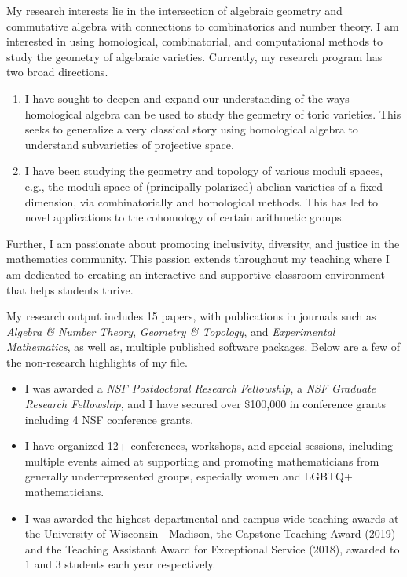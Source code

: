 \documentclass[11pt]{article}
\begin{document}
My research interests lie in the intersection of algebraic geometry and commutative algebra with connections to combinatorics and number theory. I am interested in using homological, combinatorial, and computational methods to study the geometry of algebraic varieties. Currently, my research program has two broad directions.
\begin{enumerate}[leftmargin=*,label=(\roman*)]
\item I have sought to deepen and expand our understanding of the ways homological algebra can be used to study the geometry of toric varieties. This seeks to generalize a very classical story using homological algebra to understand subvarieties of projective space.
\item I have been studying the geometry and topology of various moduli spaces, e.g., the moduli space of (principally polarized) abelian varieties of a fixed dimension, via combinatorially and homological methods. This has led to novel applications to the cohomology of certain arithmetic groups. 
\end{enumerate}
Further, I am passionate about promoting inclusivity, diversity, and justice in the mathematics community. This passion extends throughout my teaching where I am dedicated to creating an interactive and supportive classroom environment that helps students thrive.


My research output includes 15 papers, with publications in journals such as \textit{Algebra \& Number Theory}, \textit{Geometry \& Topology}, and \textit{Experimental Mathematics}, as well as, multiple published software packages. Below are a few of the non-research highlights of my file.

\begin{itemize}[leftmargin=*]
\item I was awarded a \textit{NSF Postdoctoral Research Fellowship}, a \textit{NSF Graduate Research Fellowship}, and I have secured over \$100,000 in conference grants including 4 NSF conference grants. 
\item I have organized 12+ conferences, workshops, and special sessions, including multiple events aimed at supporting and promoting mathematicians from generally underrepresented groups, especially women and LGBTQ+ mathematicians. 
\item I was awarded the highest departmental and campus-wide teaching awards at the University of Wisconsin - Madison, the Capstone Teaching Award (2019) and the Teaching Assistant Award for Exceptional Service (2018), awarded to 1 and 3 students each year respectively. 
\end{itemize}
\end{document}
